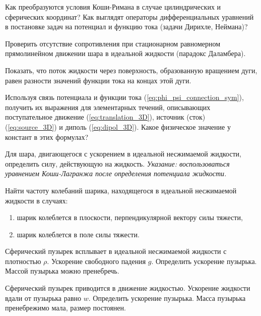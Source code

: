 \documentclass[14pt]{extarticle}
\begin{document}
\begin{problems}
	
	\item 
	Как преобразуются условия Коши-Римана в случае цилиндрических и сферических координат? Как выглядят операторы дифференциальных уравнений в постановке задач на потенциал и функцию тока (задачи Дирихле, Неймана)? 
	
	\item
	Проверить отсутствие сопротивления при стационарном равномерном прямолинейном движении шара в идеальной жидкости (парадокс Даламбера).
	
	\item Показать, что поток жидкости через поверхность, образованную вращением дуги, равен разности значений функции тока на концах этой дуги.
	
	\item Используя связь потенциала и функции тока (\ref{eq:phi_psi_connection_sym}), получить их выражения для элементарных течений, описывающих поступательное движение (\ref{eq:translation_3D}), источник (сток) (\ref{eq:source_3D}) и диполь (\ref{eq:dipol_3D}). Какое физическое значение у констант в этих формулах?
	
	\item 
	Для шара, двигающегося с ускорением в идеальной несжимаемой жидкости, определить силу, действующую на жидкость. \textit{Указание: воспользоваться уравнением Коши-Лагранжа после определения потенциала жидкости.}
	
	\item 
	Найти частоту колебаний шарика, находящегося в идеальной несжимаемой жидкости в случаях: 
	\begin{enumerate}
		\item шарик колеблется в плоскости, перпендикулярной вектору силы тяжести,
		\item шарик колеблется в поле силы тяжести.
	\end{enumerate}
	
	\item 
	Сферический пузырек всплывает в идеальной несжимаемой жидкости с плотностью $\rho$. Ускорение свободного падения $g$. Определить ускорение пузырька. Массой пузырька можно пренебречь.
	
	\item
	Сферический пузырек приводится в движение жидкостью. Ускорение жидкости вдали от пузырька равно $w$. Определить ускорение пузырька. Масса пузырька пренебрежимо мала, размер постоянен.
	
\end{problems}	
\end{document}

